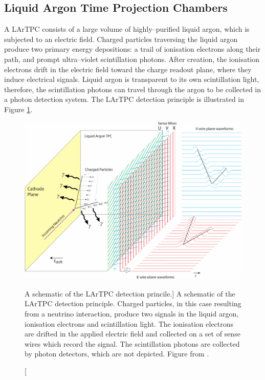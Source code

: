 \subsection{Liquid Argon Time Projection Chambers}
A LArTPC consists of a large volume of highly--purified liquid argon, which is
subjected to an electric field. Charged particles traversing the liquid argon 
produce two primary energy depositions: a trail of ionisation electrons along 
their path, and prompt ultra--violet scintillation photons. After creation, 
the ionisation electrons drift in the electric field toward the charge readout 
plane, where they induce electrical signals. Liquid argon is transparent to 
its own scintillation light, therefore, the scintillation photons can travel 
through the argon to be collected in a photon detection system. The LArTPC 
detection principle is illustrated in Figure \ref{fig:lartpc}. 

\begin{figure}

	\centering

	\includegraphics[width=\textwidth]{figures/LArTPC_Concept.pdf}

	\caption
	[A schematic of the LArTPC detection princile.]
	{A schematic of the LArTPC detection principle. Charged particles, in this
	case resulting from a neutrino interaction, produce two signals in the liquid
	argon, ionisation electrons and scintillation light. The ionisation electrons
	are drifted in the applied electric field and collected on a set of sense
	wires which record the signal. The scintillation photons are collected by 
	photon detectors, which are not depicted. Figure from \cite{Abi:2020loh}.}

	\label{fig:lartpc}

\end{figure}

